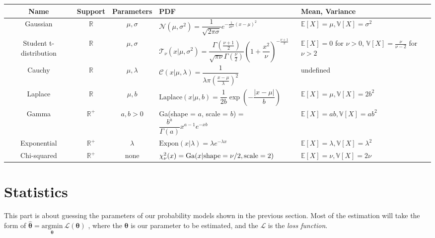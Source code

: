 \documentclass{article}
\begin{document}
\begin{center}
\begin{tabularx}{\textwidth}{c c c X X}
    \toprule
    \textbf{Name} & \textbf{Support} & \textbf{Parameters} & \textbf{PDF} & \textbf{Mean, Variance} \\
    \midrule
    Gaussian &
    \(\mathbb R\) &
    \(\mu, \sigma\) &
    \(\mathcal N(\mu, \sigma^2)=\dfrac{1}{\sqrt{2\pi\sigma}}e^{-\frac{1}{2\sigma^2}(x-\mu)^2}\) &
    \(\mathbb{E}[X] = \mu, \mathbb{V}[X] = \sigma^2\)
    \\
    \midrule
    Student t-distribution &
    \(\mathbb R\) &
    \(\mu, \sigma\) &
    \(\mathcal T_\nu(x|\mu, \sigma^2)=\dfrac{\Gamma(\frac{\nu+1}{2})}{\sqrt{\pi\nu}\Gamma(\frac{\nu}{2})}\left(1+\dfrac{x^2}{\nu}\right)^{-\frac{\nu+1}{2}}\) &
    \(\mathbb E[X] = 0\) for \(\nu>0\), \(\mathbb V[X] = \frac{\nu}{\nu - 2}\) for \(\nu > 2 \)
    \\
    \midrule
    Cauchy &
    \(\mathbb R\) &
    \(\mu,\lambda\) &
    \(\mathcal C(x|\mu,\lambda)=\dfrac{1}{\lambda\pi(\frac{x-\mu}{\lambda})^2}\) &
    undefined
    \\
    \midrule
    Laplace &
    \(\mathbb R\) &
    \(\mu, b\) &
    \(\text{Laplace}(x|\mu, b) = \dfrac{1}{2b}\exp\left(-\dfrac{|x-\mu|}{b}\right)\) &
    \(\mathbb E[X] = \mu, \mathbb V[X] = 2b^2\)
    \\
    \midrule
    Gamma &
    \(\mathbb R^+\) &
    \(a, b > 0\) &
    Ga(shape = $a$, scale = $b$) = \(\dfrac{b^a}{\Gamma(a)}x^{a-1}e^{-xb}\) &
    \(\mathbb{E}[X] = ab, \mathbb{V}[X] = ab^2\)
    \\
    \midrule
    Exponential &
    $\mathbb R^+$ &
    $\lambda$ &
    $\text{Expon}(x|\lambda) = \lambda e^{-\lambda x}$ &
    $\mathbb{E}[X] = \lambda, \mathbb{V}[X] = \lambda^2$
    \\
    \midrule
    Chi-squared &
    $\mathbb R^+$ &
    none &
    $\chi_{\nu}^{2}(x) = \newline \text{Ga}(x|\text{shape} = \nu/2, \text{scale} = 2)$ &
    $\mathbb{E}[X] = \nu, \mathbb{V}[X] = 2\nu $
    \\
    \bottomrule
\end{tabularx}
\end{center}

\newpage
\section{Statistics}
This part is about guessing the parameters of our probability models shown in the previous section.
Most of the estimation will take the form of
$\hat{\boldsymbol{\theta}} =
\underset{\boldsymbol{\theta}}{\text{argmin}}\ \mathcal L(\boldsymbol{\theta})$
, where the $\boldsymbol{\theta}$ is our parameter to be estimated, and the $\mathcal L$ is the \emph{loss function}.
\end{document}
